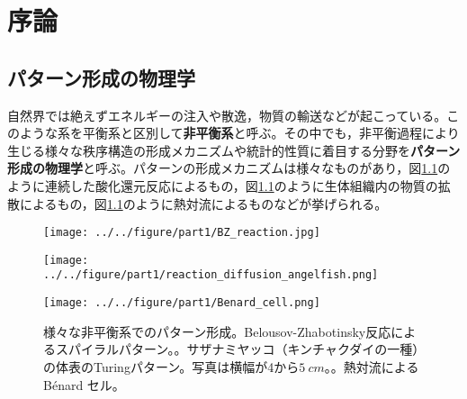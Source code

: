 \documentclass[autodetect-engine,dvi=dvipdfmx,a4paper,ja=standard,oneside,openany,11pt,draft]{bxjsbook}
\begin{document}
\chapter{序論}
\section{パターン形成の物理学}
自然界では絶えずエネルギーの注入や散逸，物質の輸送などが起こっている。このような系を平衡系と区別して\textbf{非平衡系}と呼ぶ。その中でも，非平衡過程により生じる様々な秩序構造の形成メカニズムや統計的性質に着目する分野を\textbf{パターン形成の物理学}と呼ぶ。パターンの形成メカニズムは様々なものがあり，図\ref{fig:pattern_formation}のように連続した酸化還元反応によるもの，図\ref{fig:pattern_formation}のように生体組織内の物質の拡散によるもの，図\ref{fig:pattern_formation}のように熱対流によるものなどが挙げられる。

\begin{figure}[htbp]
  \centering
  \begin{minipage}
    {0.32\textwidth}
    \subcaption{}
    \centering
    \texttt{[image: ../../figure/part1/BZ\_reaction.jpg]}
    \label{fig:BZ}
  \end{minipage}
  \begin{minipage}
    {0.32\textwidth}
    \subcaption{}
    \centering
    \texttt{[image: ../../figure/part1/reaction\_diffusion\_angelfish.png]}
    \label{fig:reaction_diffusion_angelfish}
  \end{minipage}
  \begin{minipage}
    {0.32\textwidth}
    \subcaption{}
    \centering
    \texttt{[image: ../../figure/part1/Benard\_cell.png]}
    \label{fig:Benard_cell}
  \end{minipage}
  \caption{様々な非平衡系でのパターン形成。Belousov-Zhabotinsky反応によるスパイラルパターン。\cite{BZ_reaction}。サザナミヤッコ（キンチャクダイの一種）の体表のTuringパターン。写真は横幅が4から$\SI{5}{cm}$。\cite{kondo1995reaction}。熱対流によるB{\'e}nard セル{\cite{koschmieder1993benard}。}}
  \label{fig:pattern_formation}
\end{figure}
\end{document}
